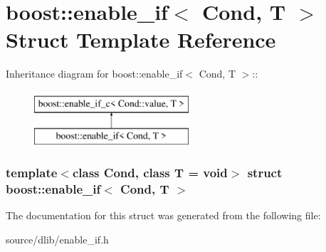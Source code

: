 \hypertarget{structboost_1_1enable__if}{
\section{boost::enable\_\-if$<$ Cond, T $>$ Struct Template Reference}
\label{structboost_1_1enable__if}
}
Inheritance diagram for boost::enable\_\-if$<$ Cond, T $>$::\begin{figure}[H]
\begin{center}
\leavevmode
\includegraphics[height=2cm]{structboost_1_1enable__if}
\end{center}
\end{figure}
\subsubsection*{template$<$class Cond, class T = void$>$ struct boost::enable\_\-if$<$ Cond, T $>$}



The documentation for this struct was generated from the following file:\begin{DoxyCompactItemize}
\item 
source/dlib/enable\_\-if.h\end{DoxyCompactItemize}
